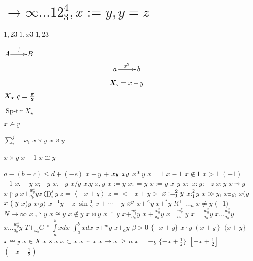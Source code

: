 \documentclass[a4paper]{article}
\DeclareMathOperator{\Sp}{Sp-t:r}
\def\nobr{} %
\begin{document}
\tableofcontents
\section{$\to\infty\ldots 12_3^4, x:=y, y=z$}

\noindent $1,23$ $1,x3$ $1, 23$

\noindent $\xymatrix@1{A\ar[r]^f&B}$
\[
\xymatrix{a \ar[r]^{x^2} & b}
\]

\begin{equation}
\hm{X_\star}=x+y
\end{equation}
\noindent $\hm{X_\star}$ $q=\hm{\frac{\pi}{3}}$

\noindent $\Sp X_\star$

\noindent $x\not\models y$

\noindent $\sum\limits_i^j\nobr-x_i$ $x\nobr\times y$ $x\nobr\bowtie y$

\noindent $\scriptstyle x\times y$ $\scriptstyle x+1$ $\scriptstyle x\cong y$

\noindent $a-(b+c)\leqslant d+(-e)$ $x-y$ $+$ $x\*y$ $x{\*}y$ $x*y$ $x=1$
$x\equiv 1$ $x\notin 1$ $x>1$ $(-1)$ $-1$ $x.-y$ $x;-y$ $x,-y$ $x/y$ $x.y$
$x,y$ $x:=y$ $x{:}=y$ $x{:=}y$ $x:y$ $x:$ $x:y:+z$ $x\colon y$ $x\leadsto y$
$x\restriction y$ $x+_{a_b}^{w^z_y} y$$x\bigoplus_i^j y$
$z=\left<-x+y\right>$ $z=<-x+y>$ $x:=\relax_1^2y$ $x:_1^2y$ $x\gg y$,
$x\exists y$, $x\bigl(y$ $x\bigm(y$ $x\bigr)y$ $x\langle y{\rangle}$
$x+^1y-z$ $\sin\frac12$ $x+\cdots+y$ $x^\bgroup y\egroup$ $x+^\leq y$ $x+^*y$
$R^+$ $\ldots_a$ $x\neq y$ $\langle-1\rangle$ $N\to\infty$
$x\rightleftharpoons y$ $x\cong y$ $x\notin y$ $x\bowtie y$ $x\doteq y$
$x+_{a_b}^{w^z_y} y$ $x+{}_{a_b}^{w^z_y} y$ $x=_{a_b}^{w^z_y} y$
$x={}_{a_b}^{w^z_y} y$ $x\ldots_{a_b}^{w^z_y}y$ $x\ldots{}_{a_b}^{w^z_y} y$
$T+_{\omega_b}G$ $^\circ$ $\int\limits_a^b xdx$ $\int\nolimits_a^b xdx$ $x+^w
y$ $x +_a y$ $\beta>0$ $\{-x+y\}$ $x\cdot y$ $\left(x+y\right\}$ $(x+y\}$
$x\cong y$ $x\in X$ $x\times x$ $x\subset x$ $x\sim x$ $x\to x$ $\ge n$
$x=-y$ $\{-x+\frac12\}$ $[-x+\frac12]$ $(-x+\frac12)$
\end{document}
